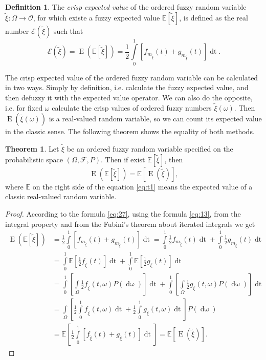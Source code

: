 \documentclass[review]{elsarticle}
\theoremstyle{definition}
\newtheorem{definition}{Definition}
\theoremstyle{theorem}
\newtheorem{theorem}{Theorem}
\DeclareMathOperator*{\dom}{d\omega}
\DeclareMathOperator*{\E}{E}
\DeclareMathOperator*{\dt}{dt}
\begin{document}
\begin{definition}
\label{def:owo1}
The {\it crisp expected value} of the ordered fuzzy random variable $ \tilde{\xi} \colon \Omega \to \mathcal{O} $, for which existe a fuzzy expected value $ \mathbb{E}[\tilde{\xi}] $, is defined as the real number $\mathcal{E}(\tilde{\xi})$ such that
\begin{equation}
\label{eq:27}
\mathcal{E}(\tilde{\xi})=\E(\mathbb{E}[\tilde{\xi}])=\frac{1}{2}\int\limits_0^1[f_{m_{\tilde{\xi}}}(t)+g_{m_{\tilde{\xi}}}(t)]\dt.
\end{equation}
\end{definition}

The crisp expected value of the ordered fuzzy random variable can be calculated in two ways. Simply by definition, i.e. calculate the fuzzy expected value, and then defuzzy it with the expected value operator. We can also do the opposite, i.e. for fixed $\omega$ calculate the  crisp values of ordered fuzzy numbers $\tilde{\xi}(\omega)$. Then $\E(\tilde{\xi}(\omega))$ is a real-valued random variable, so we can count its expected value in the classic sense. The following theorem shows the equality of both methods.

\begin{theorem}
Let $\tilde{\xi} $ be an ordered  fuzzy random variable specified on the probabilistic space $(\Omega, \mathcal{F}, P)$. Then if exist  $\mathbb{E}[\tilde{\xi}]$, then
\begin{equation}
\label{eq:t1}
\E(\mathbb{E}[\tilde{\xi}])=\mathbb{E}[\E(\tilde{\xi})],
\end{equation}
where $\mathbb{E}$ on the right side of the equation \eqref{eq:t1} means the expected value of a classic real-valued random variable. 
\end{theorem}

\begin{proof}
According to the formula \eqref{eq:27}, using the formula \eqref{eq:13}, from the integral property and from the Fubini's theorem about iterated integrals we get
\begin{align}
\E(\mathbb{E}[\tilde{\xi}])&=\frac{1}{2}\int\limits_0^1[f_{m_{\tilde{\xi}}}(t)+g_{m_{\tilde{\xi}}}(t)]\dt=\int\limits_0^1\frac{1}{2}f_{m_{\tilde{\xi}}}(t)\dt + \int\limits_0^1\frac{1}{2}g_{m_{\tilde{\xi}}}(t)\dt\nonumber\\
&=\int\limits_0^1\mathbb{E}\left[\frac{1}{2}f_{\tilde{\xi}}(t)\right]\dt + \int\limits_0^1\mathbb{E}\left[\frac{1}{2}g_{\tilde{\xi}}(t)\right]\dt\nonumber\\
&=\int\limits_0^1\left[\int\limits_{\Omega}\frac{1}{2}f_{\tilde{\xi}}(t,\omega)P(\dom)\right]\dt + \int\limits_0^1\left[\int\limits_{\Omega}\frac{1}{2}g_{\tilde{\xi}}(t,\omega)P(\dom)\right]\dt\nonumber\\
&=\int\limits_{\Omega}\left[\frac{1}{2}\int\limits_0^1f_{\tilde{\xi}}(t,\omega)\dt+\frac{1}{2}\int\limits_0^1g_{\tilde{\xi}}(t,\omega)\dt\right]P(\dom)\nonumber\\
&=\mathbb{E}\left[\frac{1}{2}\int\limits_0^1[f_{\tilde{\xi}}(t)+g_{\tilde{\xi}}(t)]\dt\right]=\mathbb{E}[\E(\tilde{\xi})]\nonumber.
\end{align}
\end{proof}
\end{document}
